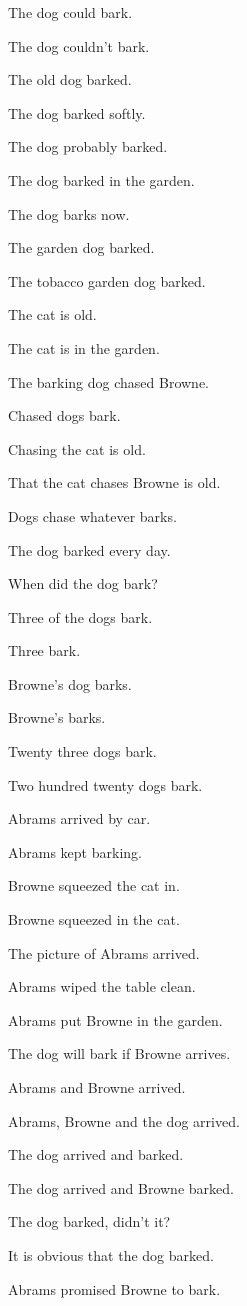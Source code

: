 The dog could bark.

The dog couldn't bark.

The old dog barked.

The dog barked softly.

The dog probably barked.

The dog barked in the garden.

The dog barks now.

The garden dog barked.

The tobacco garden dog barked.

The cat is old.

The cat is in the garden.

The barking dog chased Browne.

Chased dogs bark.

Chasing the cat is old.

That the cat chases Browne is old.

Dogs chase whatever barks.

The dog barked every day.

When did the dog bark?

Three of the dogs bark.

Three bark.

Browne's dog barks.

Browne's barks.

Twenty three dogs bark.

Two hundred twenty dogs bark.

Abrams arrived by car.

Abrams kept barking.

Browne squeezed the cat in.

Browne squeezed in the cat.

The picture of Abrams arrived.

Abrams wiped the table clean.

Abrams put Browne in the garden.

The dog will bark if Browne arrives.

Abrams and Browne arrived.

Abrams, Browne and the dog arrived.

The dog arrived and barked.

The dog arrived and Browne barked.

The dog barked, didn't it?

It is obvious that the dog barked.

Abrams promised Browne to bark.

